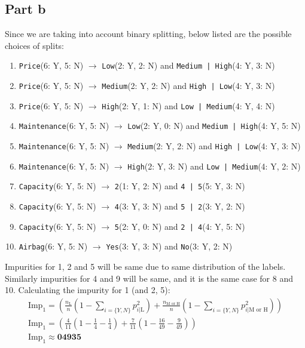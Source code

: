 \documentclass{article}
\begin{document}
\subsection*{Part b}
\begin{flushleft}
Since we are taking into account binary splitting, below listed are the possible choices of splits:
\begin{enumerate}
\item \texttt{Price}(6: Y, 5: N) \(\rightarrow\) \texttt{Low}(2: Y, 2: N) and \texttt{Medium | High}(4: Y, 3: N) 
\item \texttt{Price}(6: Y, 5: N) \(\rightarrow\) \texttt{Medium}(2: Y, 2: N) and \texttt{High | Low}(4: Y, 3: N)
\item \texttt{Price}(6: Y, 5: N) \(\rightarrow\) \texttt{High}(2: Y, 1: N) and \texttt{Low | Medium}(4: Y, 4: N)
\item \texttt{Maintenance}(6: Y, 5: N) \(\rightarrow\) \texttt{Low}(2: Y, 0: N) and \texttt{Medium | High}(4: Y, 5: N)
\item \texttt{Maintenance}(6: Y, 5: N) \(\rightarrow\) \texttt{Medium}(2: Y, 2: N) and \texttt{High | Low}(4: Y, 3: N)
\item \texttt{Maintenance}(6: Y, 5: N) \(\rightarrow\) \texttt{High}(2: Y, 3: N) and \texttt{Low | Medium}(4: Y, 2: N)
\item \texttt{Capacity}(6: Y, 5: N) \(\rightarrow\) \texttt{2}(1: Y, 2: N) and \texttt{4 | 5}(5: Y, 3: N)
\item \texttt{Capacity}(6: Y, 5: N) \(\rightarrow\) \texttt{4}(3: Y, 3: N) and \texttt{5 | 2}(3: Y, 2: N)
\item \texttt{Capacity}(6: Y, 5: N) \(\rightarrow\) \texttt{5}(2: Y, 0: N) and \texttt{2 | 4}(4: Y, 5: N)
\item \texttt{Airbag}(6: Y, 5: N) \(\rightarrow\) \texttt{Yes}(3: Y, 3: N) and \texttt{No}(3: Y, 2: N)
\end{enumerate}

Impurities for 1, 2 and 5 will be same due to same distribution of the labels. Similarly impurities for 4 and 9 will be same, and it is the same case for 8 and 10.
Calculating the impurity for 1 (and 2, 5):
\begin{gather*}
\text{Imp}_{1} = \left(\frac{n_{\text{L}}}{n} \left(1 - \sum_{i = \{Y, N\}} p_{i | \text{L}}^{2}\right) + \frac{n_{\text{M or H}}}{n} \left(1 - \sum_{i = \{Y, N\}} p_{i | \text{M or H}}^{2}\right)\right) \\
\text{Imp}_{1} = \left(\frac{4}{11} \left(1 - \frac{1}{4} - \frac{1}{4}\right) + \frac{7}{11} \left(1 - \frac{16}{49} - \frac{9}{49}\right)\right) \\
\text{Imp}_{1} \approx \mathbf{0 4935}
\end{gather*}


\end{flushleft}
\end{document}
